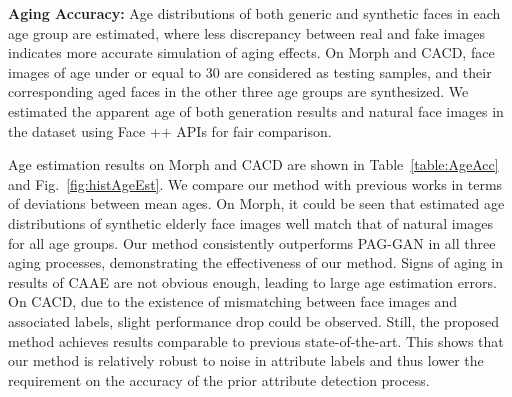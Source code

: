 \documentclass[10pt,twocolumn,letterpaper]{article}
\begin{document}
\textbf{Aging Accuracy:} Age distributions of both generic and synthetic faces in each age group are estimated, where less discrepancy between real and fake images indicates more accurate simulation of aging effects. 
On Morph and CACD, face images of age under or equal to 30 are considered as testing samples, and their corresponding aged faces in the other three age groups are synthesized. 
We estimated the apparent age of both generation results and natural face images in the dataset using Face ++ APIs for fair comparison.

Age estimation results on Morph and CACD are shown in Table~\ref{table:AgeAcc} and Fig.~\ref{fig:histAgeEst}. 
We compare our method with previous works in terms of deviations between mean ages. 
On Morph, it could be seen that estimated age distributions of synthetic elderly face images well match that of natural images for all age groups. Our method consistently outperforms PAG-GAN in all three aging processes, demonstrating the effectiveness of our method. 
Signs of aging in results of CAAE are not obvious enough, leading to large age estimation errors. 
On CACD, due to the existence of mismatching between face images and associated labels, slight performance drop could be observed. Still, the proposed method achieves results comparable to previous state-of-the-art. 
This shows that our method is relatively robust to noise in attribute labels and thus lower the requirement on the accuracy of the prior attribute detection process.
\end{document}
